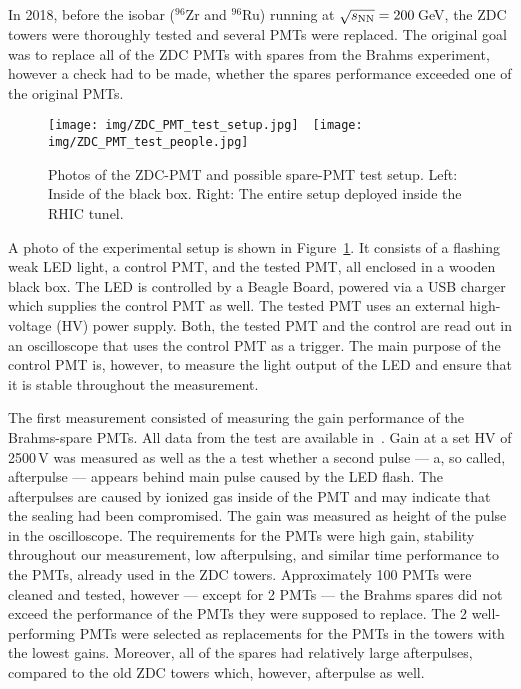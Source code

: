 In 2018, before the isobar (${}^{96}$Zr and ${}^{96}$Ru) running at $\sqrt{s_\text{NN}} = 200\,$GeV, the ZDC towers were thoroughly tested and several PMTs were replaced. The original goal was to replace all of the ZDC PMTs with spares from the Brahms experiment, however a check had to be made, whether the spares performance exceeded one of the original PMTs.

\begin{figure}[!htb]
\begin{center}
 \texttt{[image: img/ZDC\_PMT\_test\_setup.jpg]}$\quad$\texttt{[image: img/ZDC\_PMT\_test\_people.jpg]}
\end{center}
\caption{\label{photo_ZDC_PTM_setup}Photos of the ZDC-PMT and possible spare-PMT test setup. Left: Inside of the black box. Right: The entire setup deployed inside the RHIC tunel.}
\end{figure}

A photo of the experimental setup is shown in Figure~\ref{photo_ZDC_PTM_setup}\@. It consists of a flashing weak LED light, a control PMT, and the tested PMT, all enclosed in a wooden black box. The LED is controlled by a Beagle Board, powered via a USB charger which supplies the control PMT as well. The tested PMT uses an external high-voltage (HV) power supply. Both, the tested PMT and the control are read out in an oscilloscope that uses the control PMT as a trigger. The main purpose of the control PMT is, however, to measure the light output of the LED and ensure that it is stable throughout the measurement.

The first measurement consisted of measuring the gain performance of the Brahms-spare PMTs. All data from the test are available in~\cite{PMT_spreadsheet}\@. Gain at a set HV of 2500$\,$V was measured as well as the a test whether a second pulse --- a, so called, afterpulse --- appears behind main pulse caused by the LED flash. The afterpulses are caused by ionized gas inside of the PMT and may indicate that the sealing had been compromised. The gain was measured as height of the pulse in the oscilloscope. The requirements for the PMTs were high gain, stability throughout our measurement, low afterpulsing, and similar time performance to the PMTs, already used in the ZDC towers. Approximately 100 PMTs were cleaned and tested, however --- except for 2 PMTs --- the Brahms spares did not exceed the performance of the PMTs they were supposed to replace. The 2 well-performing PMTs were selected as replacements for the PMTs in the towers with the lowest gains. Moreover, all of the spares had relatively large afterpulses, compared to the old ZDC towers which, however, afterpulse as well.

